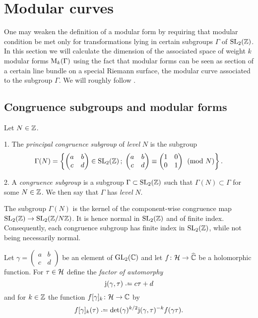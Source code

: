 \section{Modular curves}

\newcommand{\jrm}{\mathrm{j}}

One may weaken the definition of a modular form by requiring that modular condition be met only for transformations lying in certain subgroups $\Gamma$ of $\operatorname{SL}_2(\mathbb{Z})$. In this section we will calculate the dimension of the associated space of weight $k$ modular forms $\mathrm{M}_k(\Gamma)$ using the fact that modular forms can be seen as section of a certain line bundle on a special Riemann surface, the modular curve associated to the subgroup $\Gamma$. We will roughly follow \cite[Ch. 1-3]{diamond2006}.

\subsection{Congruence subgroups and modular forms}

\begin{defi}
 Let $N\in \mathbb{Z}$.
 
 1. The \emph{principal congruence subgroup} of \emph{level} $N$ is the subgroup
 \[\Gamma(N)=\left\{\begin{pmatrix} a & b \\ c & d \end{pmatrix}\in\operatorname{SL}_2(\mathbb{Z})\,;\; \begin{pmatrix}a & b \\ c & d\end{pmatrix} \equiv \begin{pmatrix}1 & 0 \\ 0 & 1\end{pmatrix} \pmod{N}\right\}.\]
 
 2. A \emph{congruence subgroup} is a subgroup $\Gamma\subset\operatorname{SL}_2(\mathbb{Z})$ such that $\Gamma(N)\subset\Gamma$ for some $N\in\mathbb{Z}$. We then say that $\Gamma$ has \emph{level} $N$. 
\end{defi}

\begin{rmk}
 The subgroup $\Gamma(N)$ is the kernel of the component-wise congruence map $\operatorname{SL}_2(\mathbb{Z})\to\operatorname{SL}_2(\mathbb{Z}/N\mathbb{Z})$. It is hence normal in $\operatorname{SL}_2(\mathbb{Z})$ and of finite index. Consequently, each congruence subgroup has finite index in $\operatorname{SL}_2(\mathbb{Z})$, while not being necessarily normal.
\end{rmk}

\begin{defi}
 Let $\gamma = \left(\begin{smallmatrix}a & b \\ c & d\end{smallmatrix}\right)$ be an element of $\operatorname{GL}_2(\mathbb{C})$ and let $f\colon\mathcal{H}\to\widehat{\mathbb{C}}$ be a holomorphic function. For $\tau\in\mathcal{H}$ define the \emph{factor of automorphy}
 \[\mathrm{j}(\gamma,\tau)\defeq c\tau+d\]
 and for $k\in \mathbb{Z}$ the function $f[\gamma]_k\colon\mathcal{H}\to\mathbb{C}$ by
 \[f[\gamma]_k(\tau) \defeq \det(\gamma)^{k/2}\jrm(\gamma,\tau)^{-k}f(\gamma\tau).\]
\end{defi}

